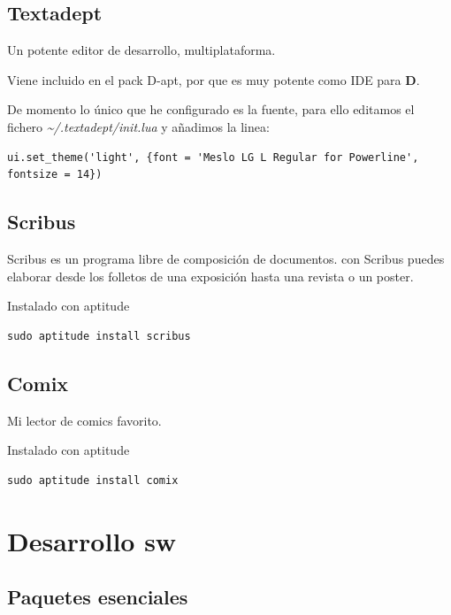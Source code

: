 \documentclass[12pt,spanish,]{scrartcl}
\begin{document}
\subsection{Textadept}\label{textadept}

Un potente editor de desarrollo, multiplataforma.

Viene incluido en el pack D-apt, por que es muy potente como IDE para
\textbf{D}.

De momento lo único que he configurado es la fuente, para ello editamos
el fichero \emph{\textasciitilde{}/.textadept/init.lua} y añadimos la
linea:

\begin{verbatim}
ui.set_theme('light', {font = 'Meslo LG L Regular for Powerline', fontsize = 14})
\end{verbatim}

\subsection{Scribus}\label{scribus}

Scribus es un programa libre de composición de documentos. con Scribus
puedes elaborar desde los folletos de una exposición hasta una revista o
un poster.

Instalado con aptitude

\begin{verbatim}
sudo aptitude install scribus
\end{verbatim}

\subsection{Comix}\label{comix}

Mi lector de comics favorito.

Instalado con aptitude

\begin{verbatim}
sudo aptitude install comix
\end{verbatim}

\section{Desarrollo sw}\label{desarrollo-sw}

\subsection{Paquetes esenciales}\label{paquetes-esenciales}
\end{document}
